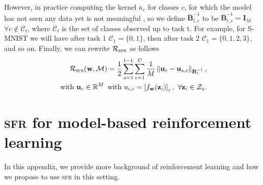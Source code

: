 \documentclass{article}
\newcommand{\our}{\textsc{sfr}\xspace}
\newcommand{\weights}{\ensuremath{\mathbf{w}}}
\newcommand{\mbf}[1]{\mathbf{#1}}
\newcommand{\MB}{\mbf{B}}
\newcommand{\MZ}{\mbf{Z}}
\newcommand{\MI}{\mbf{I}}
\newcommand{\vz}{\mbf{z}}
\newcommand{\vu}{\mbf{u}}
\begin{document}
However, in practice computing the kernel $\kappa_c$ for classes $c$, for which the model has not seen any data yet is not meaningful , so we define $\bar{\MB}^{-1}_{t, c}$ to be  $\bar{\MB}^{-1}_{t, c} = \MI_M$ $\forall c \not\in \mathcal{C}_t$, where $\mathcal{C}_t$ is the set of classes observed up to task t. For example, for S-MNIST  we will have after task 1 $\mathcal{C}_1 = \{0, 1\}$, then after task 2 $\mathcal{C}_1 = \{0, 1, 2, 3\}$, and so on. 
Finally, we can rewrite $\mathcal{R}_\mathrm{\our}$ as follows
\begin{equation}\label{eq-cl-regularizer}\textstyle
\begin{aligned}
  \mathcal{R}_\mathrm{\our}(\weights, \mathcal{M}) = \frac{1}{2} \sum_{s=1}^{t-1} \sum_{c=1}^{C} \frac{1}{M} 
	\left\lVert 
	\vu_c - \vu_{s,c} %
	\right\rVert_{\bar{\MB}^{-1}_{s}}, \\
	\text{~with~} \vu_c \in \R^M \text{~with~} u_{i, c} = \left[ f_{\weights}(\vz_{i}) \right]_c,~\forall {\vz_i} \in \mathcal{Z}_s .
\end{aligned}
\end{equation}




\section{\our for model-based reinforcement learning}
\label{app:rl}
In this appendix, we provide more background of reinforcement learning and how we propose to use
\our in this setting.
\end{document}
